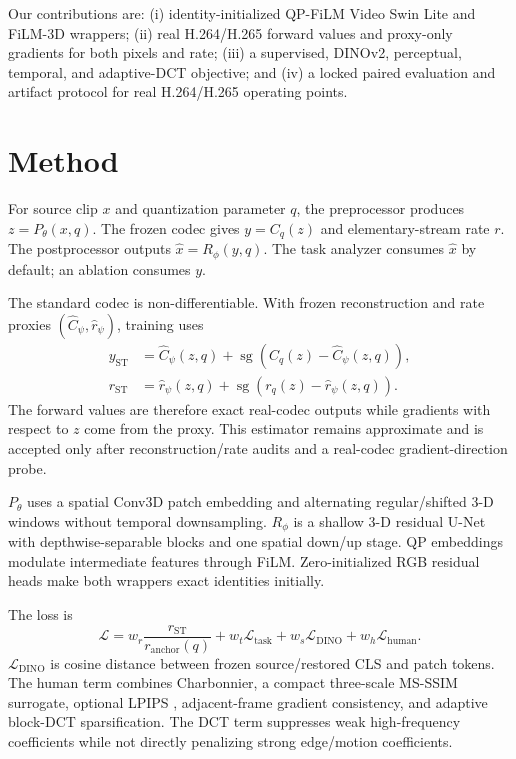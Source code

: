 \documentclass[conference]{IEEEtran}
\newcommand{\stopgrad}{\operatorname{sg}}
\begin{document}
Our contributions are: (i) identity-initialized QP-FiLM Video Swin Lite and FiLM-3D wrappers; (ii) real H.264/H.265 forward values and proxy-only gradients for both pixels and rate; (iii) a supervised, DINOv2, perceptual, temporal, and adaptive-DCT objective; and (iv) a locked paired evaluation and artifact protocol for real H.264/H.265 operating points.

\section{Method}
For source clip $x$ and quantization parameter $q$, the preprocessor produces $z=P_\theta(x,q)$. The frozen codec gives $y=C_q(z)$ and elementary-stream rate $r$. The postprocessor outputs $\hat{x}=R_\phi(y,q)$. The task analyzer consumes $\hat{x}$ by default; an ablation consumes $y$.

The standard codec is non-differentiable. With frozen reconstruction and rate proxies $(\hat C_\psi,\hat r_\psi)$, training uses
\begin{align}
y_{\mathrm{ST}} &= \hat C_\psi(z,q)+\stopgrad(C_q(z)-\hat C_\psi(z,q)),\\
r_{\mathrm{ST}} &= \hat r_\psi(z,q)+\stopgrad(r_q(z)-\hat r_\psi(z,q)).
\end{align}
The forward values are therefore exact real-codec outputs while gradients with respect to $z$ come from the proxy. This estimator remains approximate and is accepted only after reconstruction/rate audits and a real-codec gradient-direction probe.

$P_\theta$ uses a spatial Conv3D patch embedding and alternating regular/shifted 3-D windows without temporal downsampling. $R_\phi$ is a shallow 3-D residual U-Net with depthwise-separable blocks and one spatial down/up stage. QP embeddings modulate intermediate features through FiLM. Zero-initialized RGB residual heads make both wrappers exact identities initially.

The loss is
\begin{equation}
\mathcal L=w_r\frac{r_{\mathrm{ST}}}{r_{\mathrm{anchor}}(q)}+w_t\mathcal L_{\mathrm{task}}+w_s\mathcal L_{\mathrm{DINO}}+w_h\mathcal L_{\mathrm{human}}.
\end{equation}
$\mathcal L_{\mathrm{DINO}}$ is cosine distance between frozen source/restored CLS and patch tokens. The human term combines Charbonnier, a compact three-scale MS-SSIM surrogate, optional LPIPS \cite{zhang2018lpips}, adjacent-frame gradient consistency, and adaptive block-DCT sparsification. The DCT term suppresses weak high-frequency coefficients while not directly penalizing strong edge/motion coefficients.
\end{document}
